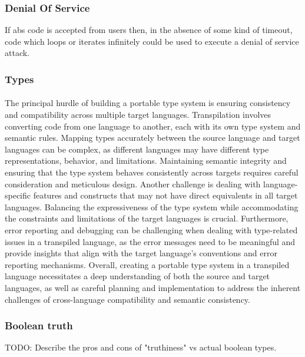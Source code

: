 \documentclass[hidelinks]{article}
\begin{document}
\subsubsection{Denial Of Service}
If abs code is accepted from users then, in the absence of some kind of timeout, code which loops or iterates infinitely could be used to execute a denial of service attack.
\subsubsection{Types}
\paragraph{}The principal hurdle of building a portable type system is ensuring consistency and compatibility across multiple target languages. Transpilation involves converting code from one language to another, each with its own type system and semantic rules. Mapping types accurately between the source language and target languages can be complex, as different languages may have different type representations, behavior, and limitations. Maintaining semantic integrity and ensuring that the type system behaves consistently across targets requires careful consideration and meticulous design. Another challenge is dealing with language-specific features and constructs that may not have direct equivalents in all target languages. Balancing the expressiveness of the type system while accommodating the constraints and limitations of the target languages is crucial. Furthermore, error reporting and debugging can be challenging when dealing with type-related issues in a transpiled language, as the error messages need to be meaningful and provide insights that align with the target language's conventions and error reporting mechanisms. Overall, creating a portable type system in a transpiled language necessitates a deep understanding of both the source and target languages, as well as careful planning and implementation to address the inherent challenges of cross-language compatibility and semantic consistency.
\subsubsection{Boolean truth}
\begin{tcolorbox}[colback=gray!20, colframe=gray!50!black, arc=4mm]
TODO: Describe the pros and cons of "truthiness" vs actual boolean types.
\end{tcolorbox}
\end{document}
